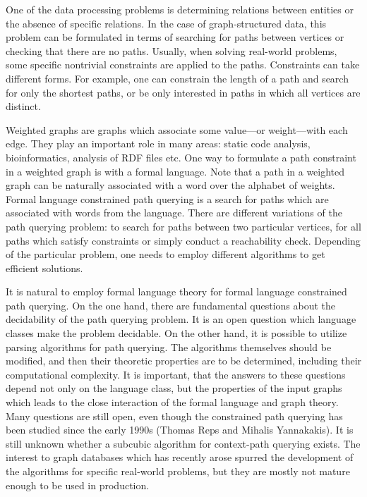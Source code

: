 \documentclass[12pt]{article}  %
\theoremstyle{remark}
\begin{document}
One of the data processing problems is determining relations between entities or the absence of specific relations.
In the case of graph-structured data, this problem can be formulated in terms of searching for paths between vertices or checking that there are no paths.
Usually, when solving real-world problems, some specific nontrivial constraints are applied to the paths. 
Constraints can take different forms.
For example, one can constrain the length of a path and search for only the shortest paths, or be only interested in paths in which all vertices are distinct.

Weighted graphs are graphs which associate some value---or weight---with each edge.
They play an important role in many areas: static code analysis, bioinformatics, analysis of RDF files etc.
One way to formulate a path constraint in a weighted graph  is with a formal language.
Note that a path in a weighted graph can be naturally associated with a word over the alphabet of weights.
Formal language constrained path querying is a search for paths which are associated with words from the language.
There are different variations of the path querying problem: to search for paths between two particular vertices, for all paths which satisfy constraints or simply conduct a reachability check.
Depending of the particular problem, one needs to employ different algorithms to get efficient solutions.

It is natural to employ formal language theory for formal language constrained path querying.
On the one hand, there are fundamental questions about the decidability of the path querying problem.
It is an open question which language classes make the problem decidable.
On the other hand, it is possible to utilize parsing algorithms for path querying.
The algorithms themselves should be modified, and then their theoretic properties are to be determined, including their computational complexity.
It is important, that the answers to these questions depend not only on the language class, but the properties of the input graphs which leads to the close interaction of the formal language and graph theory.
Many questions are still open, even though the constrained path querying has been studied since the early 1990s (Thomas Reps and Mihalis Yannakakis).
It is still unknown whether a subcubic algorithm for context-path querying exists.
The interest to graph databases which has recently arose spurred the development of the algorithms for specific real-world problems, but they are mostly not mature enough to be used in production.
\end{document}
